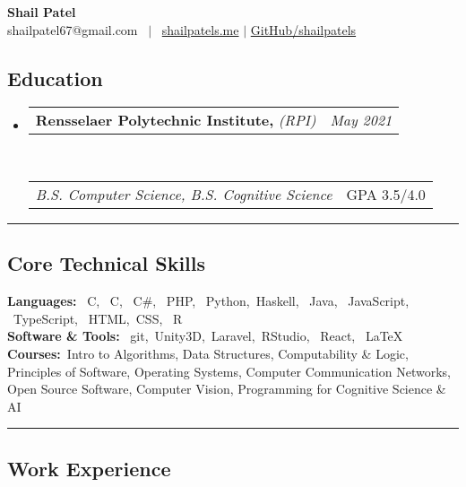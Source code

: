 \documentclass[10pt,letterpaper]{article}
\makeatletter
\newcommand{\headerrow}[2]
{\begin{tabular*}{\linewidth}{l@{\extracolsep{\fill}}r}
	#1 &
	#2 \\
\end{tabular*}}
\newcommand{\CPP}
{C\nolinebreak[4]\hspace{-.05em}\raisebox{.22ex}{\footnotesize\bf ++}}
\makeatother
\begin{document}
\begin{center}
	{\LARGE \textbf{Shail Patel}}
	\vspace{0.2em}\\
    shailpatel67@gmail.com
	 \ $\mid$ \ \href{http://shailpatels.me/}{shailpatels.me} 
	 $\mid$ \href{https://github.com/shailpatels}{GitHub/shailpatels}\\
\end{center}

\subsection*{Education}
\begin{itemize}
	\parskip=0.1em
	\item 
	\headerrow
		{\textbf{Rensselaer Polytechnic Institute,} \emph{(RPI)}}
		{\emph{May 2021}}
	\\
	\headerrow
		{\emph{B.S. Computer Science, B.S. Cognitive Science}}
		{GPA 3.5/4.0}
\end{itemize}
\hrule

\subsection*{Core Technical Skills}
\textbf{Languages:} \  C, \ \CPP, \ C\#, \ PHP, \ Python,\ Haskell, \ Java, \ JavaScript, \ TypeScript, \ HTML,\ CSS, \ R  \vspace{0.5em}\\
\textbf{Software \& Tools:} \ git,\ Unity3D,\ Laravel,\ RStudio, \ React, \ \LaTeX \vspace{0.1in}\\
\textbf{Courses:}\, Intro to Algorithms, Data Structures, Computability \& Logic, Principles of Software, Operating Systems, Computer Communication Networks, Open Source Software, Computer Vision, Programming for Cognitive Science \& AI\\
\hrule

\subsection*{Work Experience}
\end{document}
